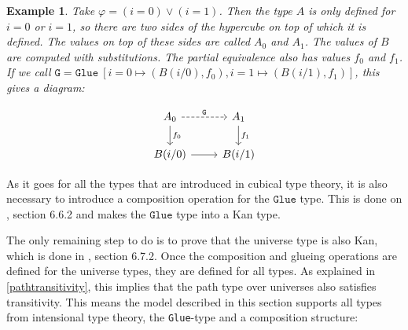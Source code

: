 \documentclass[12pt,a4paper,twoside,xetex,draft]{book}
\newtheorem{example}[theorem]{Example}
\newcommand{\op}[1]{\mathtt{#1}}
\begin{document}
\begin{example}

Take $\varphi = (i=0) \vee (i=1)$. Then the type $A$ is only defined for $i = 0$ or $i =1$, so there are two sides of the hypercube on top of which it is defined. The values on top of these sides are called $A_0$ and $A_1$. The values of $B$ are computed with substitutions. The partial equivalence also has values $f_0$ and $f_1$. If we call $\op{G} = \op{Glue} \  [i = 0 \mapsto (B(i/0),f_0), i=1 \mapsto (B(i/1), f_1)]$, this gives a diagram:

\[ \begin{tikzcd}
A_0 \arrow[r, dashed, "\op{G}" ] \arrow[d, "f_0"]	
& A_1  \arrow[d, "f_1"]  \\
B(i/0) 	
	\arrow[r, ""]
& B(i/1)  
\end{tikzcd}
\]


\end{example}

As it goes for all the types that are introduced in cubical type theory, it is also necessary to introduce a composition operation for the $\op{Glue}$ type. This is done on \cite{Huber2016}, section 6.6.2 and makes the $\op{Glue}$ type into a Kan type.

The only remaining step to do is to prove that the universe type is also Kan, which is done in \cite{Huber2016}, section 6.7.2. Once the composition and glueing operations are defined for the universe types, they are defined for all types. As explained in \cref{pathtransitivity}, this implies that the path type over universes also satisfies transitivity. This means the model described in this section supports all types from intensional type theory, the \texttt{Glue}-type and a composition structure:
\end{document}
